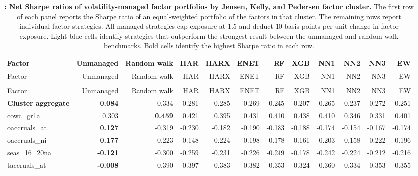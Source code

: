 \begin{landscape}
\begingroup\scriptsize
\captionsetup{justification=raggedright,labelsep=none,singlelinecheck=false,labelformat=boldlabel}
\setlength{\tabcolsep}{2.5pt}
\begin{longtable}{>{\raggedright\arraybackslash}p{2.6cm}rrrrrrrrrrr}
\caption[Net Sharpe ratios of volatility-managed factor portfolios by Jensen, Kelly, and Pedersen factor cluster.]{\footnotesize \textbf{: Net Sharpe ratios of volatility-managed factor portfolios by Jensen, Kelly, and Pedersen factor cluster.} The first row of each panel reports the Sharpe ratio of an equal-weighted portfolio of the factors in that cluster. The remaining rows report individual factor strategies. All managed strategies cap exposure at 1.5 and deduct 10 basis points per unit change in factor exposure. Light blue cells identify strategies that outperform the strongest result between the unmanaged and random-walk benchmarks. Bold cells identify the highest Sharpe ratio in each row.}\label{tab:rv-portfolio_factor_sharpe}\\
\hline
Factor & Unmanaged & Random walk & HAR & HARX & ENET & RF & XGB & NN1 & NN2 & NN3 & EW \\
\hline\endfirsthead
\hline
Factor & Unmanaged & Random walk & HAR & HARX & ENET & RF & XGB & NN1 & NN2 & NN3 & EW \\
\hline\endhead
\hline\endfoot
\multicolumn{12}{@{}l}{\textit{Panel A. Accruals}} \\
\hline
Factor & Unmanaged & Random walk & HAR & HARX & ENET & RF & XGB & NN1 & NN2 & NN3 & EW \\
\hline
\textbf{Cluster aggregate} & \textbf{0.084} & -0.334 & -0.281 & -0.285 & -0.269 & -0.245 & -0.207 & -0.265 & -0.237 & -0.272 & -0.251 \\
cowc\_gr1a & 0.303 & \textbf{0.459} & 0.421 & 0.395 & 0.431 & 0.410 & 0.438 & 0.410 & 0.346 & 0.331 & 0.401 \\
oaccruals\_at & \textbf{0.127} & -0.319 & -0.230 & -0.182 & -0.190 & -0.183 & -0.188 & -0.174 & -0.154 & -0.167 & -0.174 \\
oaccruals\_ni & \textbf{0.177} & -0.223 & -0.148 & -0.224 & -0.198 & -0.178 & -0.161 & -0.203 & -0.158 & -0.222 & -0.196 \\
seas\_16\_20na & \textbf{-0.121} & -0.300 & -0.259 & -0.231 & -0.226 & -0.249 & -0.178 & -0.242 & -0.224 & -0.212 & -0.216 \\
taccruals\_at & \textbf{-0.008} & -0.390 & -0.397 & -0.383 & -0.382 & -0.353 & -0.324 & -0.360 & -0.334 & -0.353 & -0.355 \\

\end{longtable}
\end{landscape}
